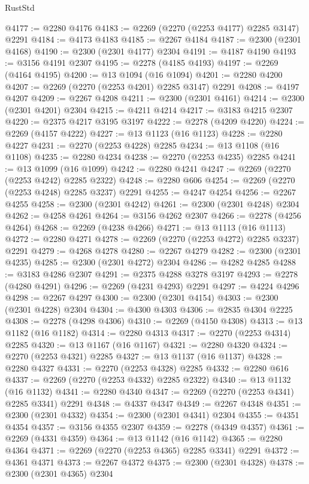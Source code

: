 \begin{lexlean}{RustStd}
\begin{coremodule}
@4177 := @2280 @4176
@4183 := @2269 (@2270 (@2253 @4177) @2285 @3147) @2291
@4184 := @4173 @4183
@4185 := @2267 @4184
@4187 := @2300 (@2301 @4168)
@4190 := @2300 (@2301 @4177) @2304
@4191 := @4187 @4190
@4193 := @3156 @4191 @2307
@4195 := @2278 (@4185 @4193)
@4197 := @2269 (@4164 @4195)
@4200 := @13 @1094 (@16 @1094)
@4201 := @2280 @4200
@4207 := @2269 (@2270 (@2253 @4201) @2285 @3147) @2291
@4208 := @4197 @4207
@4209 := @2267 @4208
@4211 := @2300 (@2301 @4161)
@4214 := @2300 (@2301 @4201) @2304
@4215 := @4211 @4214
@4217 := @3183 @4215 @2307
@4220 := @2375 @4217 @3195 @3197
@4222 := @2278 (@4209 @4220)
@4224 := @2269 (@4157 @4222)
@4227 := @13 @1123 (@16 @1123)
@4228 := @2280 @4227
@4231 := @2270 (@2253 @4228) @2285
@4234 := @13 @1108 (@16 @1108)
@4235 := @2280 @4234
@4238 := @2270 (@2253 @4235) @2285
@4241 := @13 @1099 (@16 @1099)
@4242 := @2280 @4241
@4247 := @2269 (@2270 (@2253 @4242) @2285 @2322)
@4248 := @2280 @606
@4254 := @2269 (@2270 (@2253 @4248) @2285 @3237) @2291
@4255 := @4247 @4254
@4256 := @2267 @4255
@4258 := @2300 (@2301 @4242)
@4261 := @2300 (@2301 @4248) @2304
@4262 := @4258 @4261
@4264 := @3156 @4262 @2307
@4266 := @2278 (@4256 @4264)
@4268 := @2269 (@4238 @4266)
@4271 := @13 @1113 (@16 @1113)
@4272 := @2280 @4271
@4278 := @2269 (@2270 (@2253 @4272) @2285 @3237) @2291
@4279 := @4268 @4278
@4280 := @2267 @4279
@4282 := @2300 (@2301 @4235)
@4285 := @2300 (@2301 @4272) @2304
@4286 := @4282 @4285
@4288 := @3183 @4286 @2307
@4291 := @2375 @4288 @3278 @3197
@4293 := @2278 (@4280 @4291)
@4296 := @2269 (@4231 @4293) @2291
@4297 := @4224 @4296
@4298 := @2267 @4297
@4300 := @2300 (@2301 @4154)
@4303 := @2300 (@2301 @4228) @2304
@4304 := @4300 @4303
@4306 := @2835 @4304 @2225
@4308 := @2278 (@4298 @4306)
@4310 := @2269 (@4150 @4308)
@4313 := @13 @1182 (@16 @1182)
@4314 := @2280 @4313
@4317 := @2270 (@2253 @4314) @2285
@4320 := @13 @1167 (@16 @1167)
@4321 := @2280 @4320
@4324 := @2270 (@2253 @4321) @2285
@4327 := @13 @1137 (@16 @1137)
@4328 := @2280 @4327
@4331 := @2270 (@2253 @4328) @2285
@4332 := @2280 @616
@4337 := @2269 (@2270 (@2253 @4332) @2285 @2322)
@4340 := @13 @1132 (@16 @1132)
@4341 := @2280 @4340
@4347 := @2269 (@2270 (@2253 @4341) @2285 @3341) @2291
@4348 := @4337 @4347
@4349 := @2267 @4348
@4351 := @2300 (@2301 @4332)
@4354 := @2300 (@2301 @4341) @2304
@4355 := @4351 @4354
@4357 := @3156 @4355 @2307
@4359 := @2278 (@4349 @4357)
@4361 := @2269 (@4331 @4359)
@4364 := @13 @1142 (@16 @1142)
@4365 := @2280 @4364
@4371 := @2269 (@2270 (@2253 @4365) @2285 @3341) @2291
@4372 := @4361 @4371
@4373 := @2267 @4372
@4375 := @2300 (@2301 @4328)
@4378 := @2300 (@2301 @4365) @2304

\end{coremodule}
\end{lexlean}
